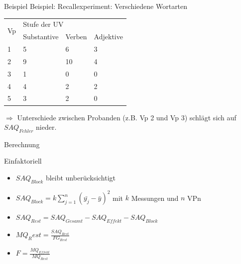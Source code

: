 \documentclass{beamer}
\begin{document}
	\begin{frame}{Beispiel}
		Beispiel: Recallexperiment: Verschiedene Wortarten
		\begin{table}[]
			\centering
			\begin{tabular}{|l|l|l|l|}
				\hline
				\multirow{2}{*}{Vp} & \multicolumn{3}{l|}{Stufe der UV} \\
				& Substantive  & Verben & Adjektive \\ \hline
				1                   & 5            & 6      & 3         \\ \hline
				2                   & 9            & 10     & 4         \\ \hline
				3                   & 1            & 0      & 0         \\ \hline
				4                   & 4            & 2      & 2         \\ \hline
				5                   & 3            & 2      & 0         \\ \hline
			\end{tabular}
		\end{table}
		$\Rightarrow$ Unterschiede zwischen Probanden (z.B. Vp 2 und Vp 3) schlägt sich auf $SAQ_{Fehler}$ nieder.
	\end{frame}
	
	\begin{frame}{Berechnung}
		\begin{block}{Einfaktoriell}
			\begin{itemize}\itemsep=1ex
				\item $SAQ_{Block}$ bleibt unberücksichtigt
				\item $SAQ_{Block} = k \sum_{j=1}^{n}(\bar{y_j}- \bar{y})^2$ mit $k$ Messungen und $n$ VPn
				\item $SAQ_{Rest} = SAQ_{Gesamt} - SAQ_{Effekt} - SAQ_{Block}$
				\item $MQ_Rest = \frac{SAQ_{Rest}}{FG_{Rest}}$
				\item $F = \frac{MQ_{Effekt}}{MQ_{Rest}}$
			\end{itemize}
		\end{block}
	\end{frame}
	
\end{document}
